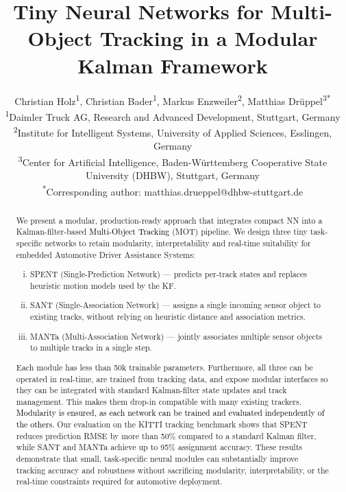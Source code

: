 \documentclass[letterpaper, 10 pt, journal, twoside]{IEEEtran}
\newcommand{\red}[1]{\textcolor{black}{#1}}
\begin{document}
\title{Tiny Neural Networks for Multi-Object Tracking in a Modular Kalman Framework}

\author{Christian Holz\textsuperscript{1}, Christian Bader\textsuperscript{1}, Markus Enzweiler\textsuperscript{2}, Matthias Drüppel\textsuperscript{3*}

\begin{small}
\textsuperscript{1}Daimler Truck AG, Research and Advanced Development, Stuttgart, Germany \\
\textsuperscript{2}Institute for Intelligent Systems, University of Applied Sciences, Esslingen, Germany \\
\textsuperscript{3}Center for Artificial Intelligence, Baden-Württemberg Cooperative State University (DHBW), Stuttgart, Germany \\
\textsuperscript{*}Corresponding author: matthias.drueppel@dhbw-stuttgart.de
\end{small}

}

\maketitle

\begin{abstract}

We present a modular, production-ready approach that integrates compact \ac{NN} into a Kalman-filter-based \red{Multi-Object Tracking} (MOT) pipeline. We design three tiny task-specific networks to retain modularity, interpretability and real-time suitability for embedded Automotive Driver Assistance Systems:
\begin{enumerate}[(i)]
\item SPENT (Single-Prediction Network) — predicts per-track states and replaces heuristic motion models used by the \ac{KF}.
\item  SANT (Single-Association Network) — assigns a single incoming sensor object to existing tracks, without relying on heuristic distance and association metrics.
\item MANTa (Multi-Association Network) — jointly associates multiple sensor objects to multiple tracks in a single step.
\end{enumerate}
Each module has less than 50k trainable parameters. Furthermore, all three can be operated in real-time, are trained from tracking data, and expose modular interfaces so they can be integrated with standard Kalman-filter state updates and track management. This makes them drop-in compatible with many existing trackers. \red{Modularity is ensured, as each network can be trained and evaluated independently of the others.} Our evaluation on the KITTI tracking benchmark shows that SPENT reduces prediction RMSE by more than 50\% compared to a standard Kalman filter, while SANT and MANTa achieve up to 95\% assignment accuracy. These results demonstrate that small, task-specific neural modules can substantially improve tracking accuracy and robustness without sacrificing modularity, interpretability, or the real-time constraints required for automotive deployment.
\end{abstract}
\end{document}
